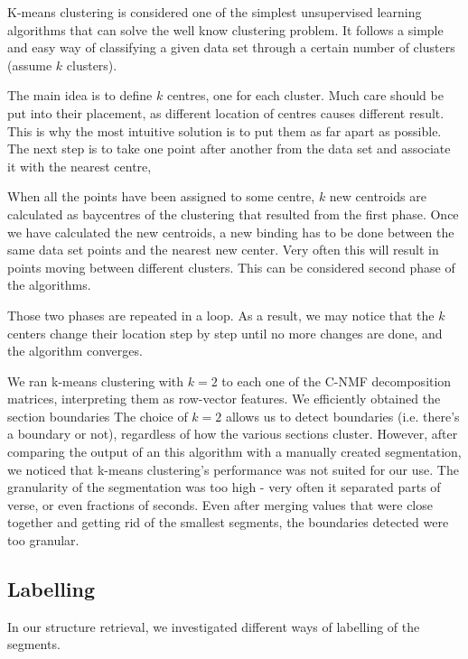 K-means clustering is considered one of the simplest unsupervised learning algorithms that can solve the well know clustering problem. It follows a simple and easy way of classifying a given data set through a certain number of clusters (assume $k$ clusters).

The main idea  is to define $k$ centres, one for each cluster. Much care should be put into their placement, as different location of centres causes different result. This is why the most intuitive solution is to put them as far apart as possible. The next step is to take one point after another from the data set and associate it with the nearest centre, 

When all the points have been assigned to some centre, $k$ new centroids are calculated as baycentres of the clustering that resulted from the first phase. Once we have calculated the new centroids, a new binding has to be done  between the same data set points and the nearest new center. Very often this will result in points moving between different clusters. This can be considered second phase of the algorithms. 

Those two phases are repeated in a loop. As a result, we may notice that the $k$ centers change their location step by step until no more changes are done, and the algorithm converges. 

We ran k-means clustering with $k = 2$ to each one of the C-NMF decomposition matrices, interpreting them as row-vector features. We efficiently obtained the section boundaries The choice of $k = 2$ allows us to detect boundaries (i.e. there’s a boundary or not), regardless of how the various sections cluster. However, after comparing the output of an this algorithm with a manually created segmentation, we noticed that k-means clustering's performance was not suited for our use. The granularity of the segmentation was too high - very often it separated parts of verse, or even fractions of seconds. Even after merging values that were close together and getting rid of the smallest segments, the boundaries detected were too granular.

\vspace{10pt}


\subsection{Labelling}

In our structure retrieval, we investigated different ways of labelling of the segments.

